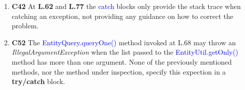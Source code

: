 \begin{enumerate}
  \item \textbf{C42} At \textbf{L.62} and \textbf{L.77} the \textcolor{blue}{catch}
    blocks only provide the stack trace when catching an exception, not providing
    any guidance on how to correct the problem.

  \item \textbf{C52} The \textcolor{blue}{EntityQuery.queryOne()} method invoked
    at L.68 may throw an \textit{IllegalArgumentException} when the list passed
    to the \textcolor{blue}{EntityUtil.getOnly()} method has more than one
    argument. None of the previously mentioned methods, nor the method under
    inspection, specify this expection in a \textbf{try/catch} block.

\end{enumerate}
